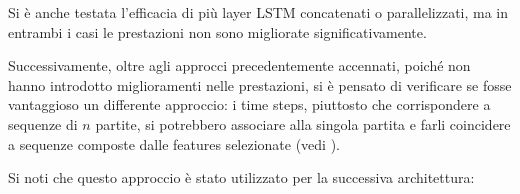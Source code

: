 Si è anche testata l'efficacia di più layer LSTM concatenati o parallelizzati, ma in entrambi i casi le prestazioni non sono migliorate significativamente. 

Successivamente, oltre agli approcci precedentemente accennati, poiché non hanno introdotto miglioramenti nelle prestazioni, si è pensato di verificare se fosse vantaggioso un differente approccio: i time steps, piuttosto che corrispondere a sequenze di $n$ partite, si potrebbero associare alla singola partita e farli coincidere a sequenze composte dalle features selezionate (vedi \cite{web:football_lstm}).

Si noti che questo approccio è stato utilizzato per la successiva architettura:



